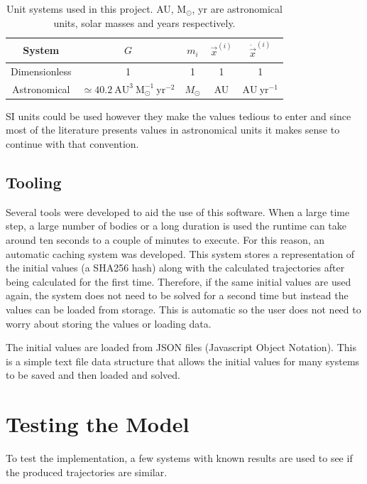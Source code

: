 \documentclass{physics_article_B}
\begin{document}
\begin{table}[H]
 \centering
 \caption{Unit systems used in this project. AU, $\mathrm{M_\odot}$, yr are astronomical units, solar masses and years respectively.}

 \setlength{\tabcolsep}{0.5em}
 \renewcommand{\arraystretch}{1.5}
 \begin{tabular}{|c|c|c|c|c|}
 \hline
 System & $G$ & $m_i$ & $\vec{x}^{(i)}$ & $\dot{\vec{x}}^{(i)}$ \\
 \hline
 Dimensionless & 1 & 1 & 1 & 1 \\
 Astronomical & $\simeq 40.2\ \mathrm{AU^3\ M_\odot^{-1}\ yr^{-2}}$ & $M_\odot$ & AU & $\mathrm{AU\ yr^{-1}}$ \\
 \hline
 \end{tabular}
 \label{tab:unitsys}
\end{table}

SI units could be used however they make the values tedious to enter and since most of the literature presents values in astronomical units it makes sense to continue with that convention.

\subsection{Tooling}

Several tools were developed to aid the use of this software. When a large time step, a large number of bodies or a long duration is used the runtime can take around ten seconds to a couple of minutes to execute. For this reason, an automatic caching system was developed. This system stores a representation of the initial values (a SHA256 hash) along with the calculated trajectories after being calculated for the first time. Therefore, if the same initial values are used again, the system does not need to be solved for a second time but instead the values can be loaded from storage. This is automatic so the user does not need to worry about storing the values or loading data.

The initial values are loaded from JSON files (Javascript Object Notation). This is a simple text file data structure that allows the initial values for many systems to be saved and then loaded and solved.

\section{Testing the Model}
To test the implementation, a few systems with known results are used to see if the produced trajectories are similar.
\end{document}
